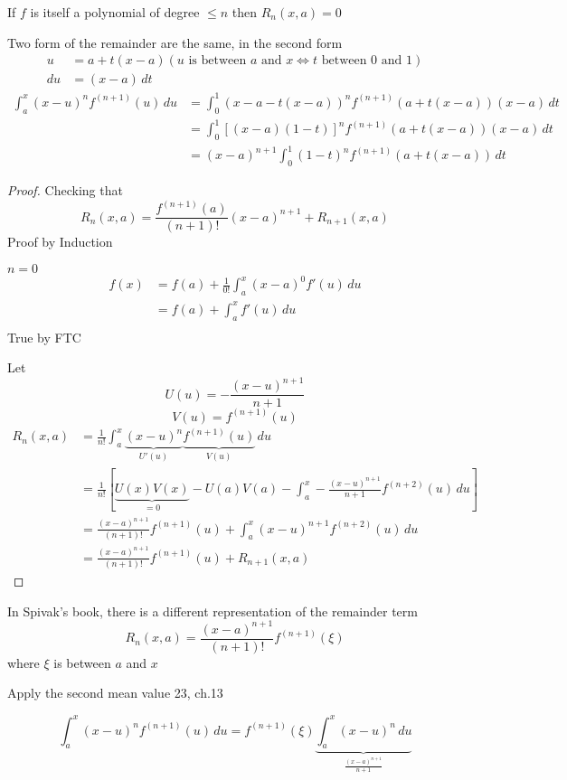 If $f$ is itself a polynomial of degree $\le n$ then $R_n(x, a) = 0$

Two form of the remainder are the same, in the second form 
\begin{align*}
  u &= a + t(x-a) (u\text{ is between } a \text{ and } x \iff t \text{ between 0 and 1})\\ 
  du &= (x-a)\, dt
\end{align*}
\begin{align*}
  \int_a^x(x-u)^nf^{(n+1)}(u)\, du &= \int_0^1(x-a -t(x-a))^nf^{(n+1)}(a + t(x-a))(x-a)\, dt \\ 
  &= \int_0^1\left[(x-a)(1-t)\right]^nf^{(n+1)}(a + t(x-a))(x-a)\, dt \\
  &= (x-a)^{n+1} \int_0^1(1-t)^nf^{(n+1)}(a + t(x-a))\, dt
\end{align*}

\begin{proof}
  Checking that 
  \[R_n(x, a) = \frac{f^{(n+1)}(a)}{(n+1)!}(x-a)^{n+1} + R_{n+1}(x, a)\]
  Proof by Induction

  $n = 0$
  \begin{align*}
    f(x) &= f(a) + \frac{1}{0!}\int_a^x(x-a)^0f'(u)\, du\\
    &= f(a) + \int_a^x f'(u) \, du\\
  \end{align*}
  True by FTC

  Let
  \[U(u) = -\frac{(x-u)^{n+1}}{n+1}\]
  \[V(u) = f^{(n+1)}(u)\]
  \begin{align*}
    R_n(x, a) &= \frac{1}{n!}\int_a^x\underbrace{(x-u)^n}_{U'(u)}\underbrace{f^{(n+1)}(u)}_{V(u)}\, du\\
    &= \frac{1}{n!}\left[\underbrace{U(x)V(x)}_{=0}-U(a)V(a) -\int_a^x-\frac{(x-u)^{n+1}}{n+1}f^{(n+2)}(u)\, du\right] \\
    &= \frac{(x-a)^{n+1}}{(n+1)!}f^{(n+1)}(u) + \int_a^x (x-u)^{n+1}f^{(n+2)}(u)\, du \\
    &=  \frac{(x-a)^{n+1}}{(n+1)!}f^{(n+1)}(u) + R_{n+1}(x, a) 
  \end{align*}
\end{proof}

In Spivak's book, there is a different representation of the remainder term
\[R_n(x, a) = \frac{(x-a)^{n+1}}{(n+1)!}f^{(n+1)}(\xi)\]
where $\xi$ is between $a$ and $x$

Apply the second mean value 23, ch.13

\[\int_a^x (x-u)^nf^{(n+1)}(u)\, du = f^{(n+1)}(\xi) \underbrace{\int_a^x (x-u)^n \, du}_{\frac{(x-a)^{n+1}}{n+1}}\]

